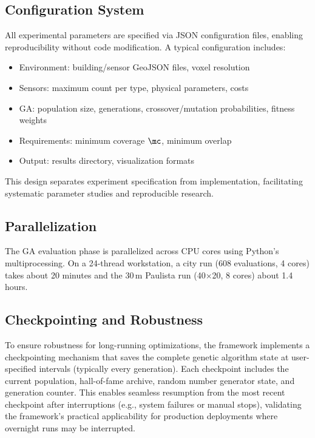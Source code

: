\subsection{Configuration System}

All experimental parameters are specified via JSON configuration files, enabling reproducibility without code modification. A typical configuration includes:

\begin{itemize}
\item Environment: building/sensor GeoJSON files, voxel resolution
\item Sensors: maximum count per type, physical parameters, costs
\item GA: population size, generations, crossover/mutation probabilities, fitness weights
\item Requirements: minimum coverage $\mc$, minimum overlap
\item Output: results directory, visualization formats
\end{itemize}

This design separates experiment specification from implementation, facilitating systematic parameter studies and reproducible research.

\subsection{Parallelization}

The GA evaluation phase is parallelized across CPU cores using Python's multiprocessing. On a 24-thread workstation, a city run (608 evaluations, 4 cores) takes about 20 minutes and the 30\,m Paulista run (40\(\times\)20, 8 cores) about 1.4 hours.

\subsection{Checkpointing and Robustness}

To ensure robustness for long-running optimizations, the framework implements a checkpointing mechanism that saves the complete genetic algorithm state at user-specified intervals (typically every generation). Each checkpoint includes the current population, hall-of-fame archive, random number generator state, and generation counter. This enables seamless resumption from the most recent checkpoint after interruptions (e.g., system failures or manual stops), validating the framework's practical applicability for production deployments where overnight runs may be interrupted.

